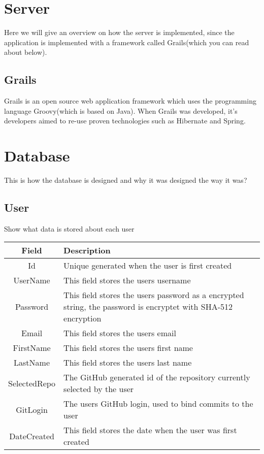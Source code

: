 \section{Server}
Here we will give an overview on how the server is implemented, since the application is implemented with a framework called Grails(which you can read about below).

\subsection{Grails}
Grails is an open source web application framework which uses the programming language Groovy(which is based on Java). When Grails was developed, it's developers aimed to re-use proven technologies such as Hibernate and Spring.

\section{Database}

This is how the database is designed and why it was designed the way it was?

\subsection*{User}
Show what data is stored about each user\\
\vspace{0.5cm}
 \begin{tabularx}{\linewidth}{| c | X |}
    \hline
    \rowcolor[gray]{0.8}
    \textbf{Field} & \textbf{Description} \\
    \hline
    Id & Unique generated when the user is first created\\ \hline
    UserName & This field stores the users username\\ \hline
   	Password & This field stores the users password as a encrypted string, the password is encryptet with SHA-512 encryption\\ \hline
    Email & This field stores the users email\\ \hline
    FirstName & This field stores the users first name\\ \hline
    LastName & This field stores the users last name\\ \hline
    SelectedRepo & The GitHub generated id of the repository currently selected by the user\\ \hline
    GitLogin & The users GitHub login, used to bind commits to the user\\ \hline
    DateCreated & This field stores the date when the user was first created\\
    \hline
\end{tabularx}



